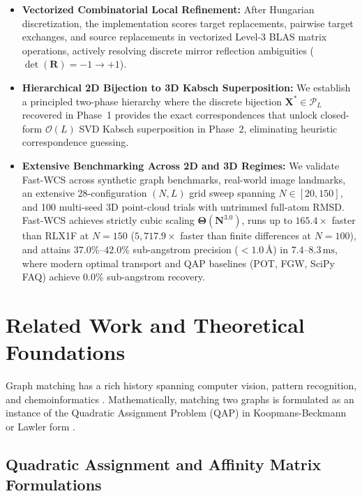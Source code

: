 \documentclass[conference]{IEEEtran}
\begin{document}
\begin{itemize}
    \item \textbf{Vectorized Combinatorial Local Refinement:} After Hungarian discretization, the implementation scores target replacements, pairwise target exchanges, and source replacements in vectorized Level-3 BLAS matrix operations, actively resolving discrete mirror reflection ambiguities ($\det(\mathbf{R}) = -1 \to +1$).
    \item \textbf{Hierarchical 2D Bijection to 3D Kabsch Superposition:} We establish a principled two-phase hierarchy where the discrete bijection $\mathbf{X}^* \in \mathcal{P}_L$ recovered in Phase~1 provides the exact correspondences that unlock closed-form $\mathcal{O}(L)$ SVD Kabsch superposition in Phase~2, eliminating heuristic correspondence guessing.
    \item \textbf{Extensive Benchmarking Across 2D and 3D Regimes:} We validate Fast-WCS across synthetic graph benchmarks, real-world image landmarks, an extensive 28-configuration $(N, L)$ grid sweep spanning $N \in [20, 150]$, and 100 multi-seed 3D point-cloud trials with untrimmed full-atom RMSD. Fast-WCS achieves strictly cubic scaling $\mathbf{\Theta(N^{3.0})}$, runs up to $165.4\times$ faster than RLX1F at $N=150$ ($5,717.9\times$ faster than finite differences at $N=100$), and attains $\mathbf{37.0\%\text{--}42.0\%}$ sub-angstrom precision ($< 1.0\,\text{\AA}$) in $7.4\text{--}8.3\,\text{ms}$, where modern optimal transport and QAP baselines (POT, FGW, SciPy FAQ) achieve $0.0\%$ sub-angstrom recovery.
\end{itemize}


\section{Related Work and Theoretical Foundations}
\label{sec:related_work}

Graph matching has a rich history spanning computer vision, pattern recognition, and chemoinformatics \cite{conte2004, emmert2007}. Mathematically, matching two graphs is formulated as an instance of the Quadratic Assignment Problem (QAP) in Koopmans-Beckmann \cite{koopmans1957} or Lawler form \cite{lawler1963}.

\subsection{Quadratic Assignment and Affinity Matrix Formulations}
\end{document}
